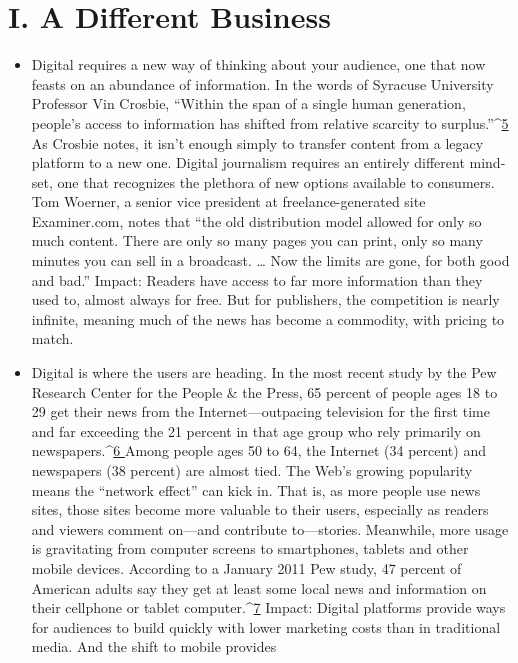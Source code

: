 \section{I. A Different Business}
\begin{itemize}
\item Digital requires a new way of thinking about your audience, one that
now feasts on an abundance of information. In the words of Syracuse
University Professor Vin Crosbie, ``Within the span of a single human generation,
people’s access to information has shifted from relative scarcity to
surplus.''^{\href{#endnotes-ch1}{5 }}As Crosbie notes, it isn’t enough simply to transfer content from
a legacy platform to a new one. Digital journalism requires an entirely different
mind-set, one that recognizes the plethora of new options available
to consumers. Tom Woerner, a senior vice president at freelance-generated
site Examiner.com, notes that ``the old distribution model allowed for only
so much content. There are only so many pages you can print, only so many
minutes you can sell in a broadcast. … Now the limits are gone, for both
good and bad.''
Impact: Readers have access to far more information than they used to,
almost always for free. But for publishers, the competition is nearly infinite,
meaning much of the news has become a commodity, with pricing to match.
\item Digital is where the users are heading. In the most recent study by the
Pew Research Center for the People & the Press, 65 percent of people ages
18 to 29 get their news from the Internet—outpacing television for the first
time and far exceeding the 21 percent in that age group who rely primarily
on newspapers.^{\href{#endnotes-ch1}{6 }}Among people ages 50 to 64, the Internet (34 percent)
and newspapers (38 percent) are almost tied. The Web’s growing popularity
means the ``network effect'' can kick in. That is, as more people use news
sites, those sites become more valuable to their users, especially as readers and
viewers comment on—and contribute to—stories. Meanwhile, more usage
is gravitating from computer screens to smartphones, tablets and other mobile
devices. According to a January 2011 Pew study, 47 percent of American
adults say they get at least some local news and information on their cellphone
or tablet computer.^{\href{#endnotes-ch1}{7}}%
Impact: Digital platforms provide ways for audiences to build quickly with
lower marketing costs than in traditional media. And the shift to mobile provides

\end{itemize}
